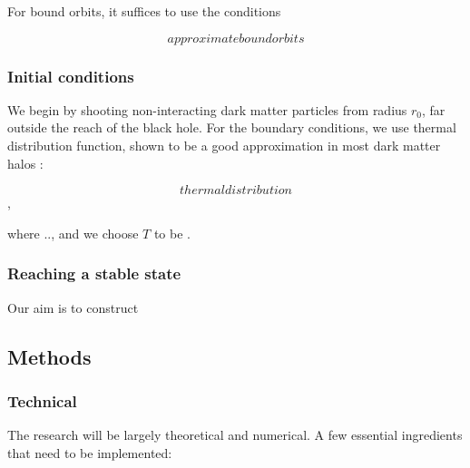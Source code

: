 \documentclass[a4paper,10pt]{article}
\begin{document}
For bound orbits, it suffices to use the conditions

\begin{equation}
 approximateboundorbits
\end{equation}

\subsubsection{Initial conditions}

We begin by shooting non-interacting dark matter particles from radius $r_0$, far outside the reach of the black hole. 
For the boundary conditions, we use thermal distribution function, shown to be a good approximation in most 
dark matter halos \citep{dm_halo_maxwellian}:

\begin{equation}
 thermaldistribution
\end{equation},

where .., and we choose $T$ to be \citep{should_be_known}. %

\subsubsection{Reaching a stable state}

Our aim is to construct 


\subsection{Methods}


\subsubsection{Technical}

The research will be largely theoretical and numerical. A few essential ingredients that need to be implemented:
\end{document}
